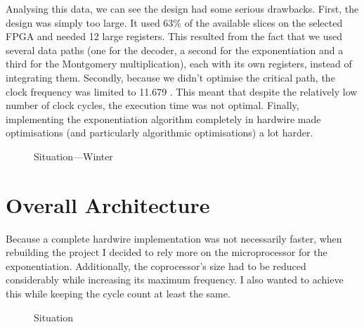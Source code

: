 \documentclass[a4paper]{article}
\begin{document}
Analysing this data, we can see the design had some serious drawbacks. First, the design was simply too large. It used 63\% of the available slices on the selected FPGA and needed 12 large registers. This resulted from the fact that we used several data paths (one for the decoder, a second for the exponentiation and a third for the Montgomery multiplication), each with its own registers, instead of integrating them. Secondly, because we didn't optimise the critical path, the clock frequency was limited to 11.679 \mega\hertz. This meant that despite the relatively low number of clock cycles, the execution time was not optimal. Finally, implementing the exponentiation algorithm completely in hardwire made optimisations (and particularly algorithmic optimisations) a lot harder.

\begin{figure}[H]
	\caption{Situation---Winter}
	\label{fig:situation_winter}
\end{figure}

\section{Overall Architecture}
\label{sec:overall_architecture}

Because a complete hardwire implementation was not necessarily faster, when rebuilding the project I decided to rely more on the microprocessor for the exponentiation. Additionally, the coprocessor's size had to be reduced considerably while increasing its maximum frequency. I also wanted to achieve this while keeping the cycle count at least the same.\\

\begin{figure}[H]
	\caption{Situation}
	\label{fig:situation_winter}
\end{figure}
\end{document}
